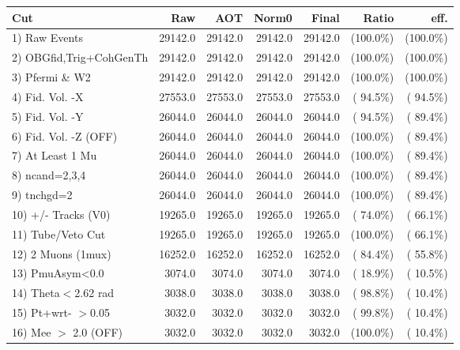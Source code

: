  \begin{table}[h!]\centering
 \begin{tabular}{||l||r|r|r|r|r|r||}
 \hline
 \hline
 Cut & Raw & AOT & Norm0 & Final & Ratio & eff.       \\
 \hline
  1) Raw Events           &      29142.0 &      29142.0 &      29142.0 &      29142.0 & (100.0\%) & (100.0\%) \\
  2) OBGfid,Trig+CohGenTh &      29142.0 &      29142.0 &      29142.0 &      29142.0 & (100.0\%) & (100.0\%) \\
  3) Pfermi \& W2         &      29142.0 &      29142.0 &      29142.0 &      29142.0 & (100.0\%) & (100.0\%) \\
  4) Fid. Vol. -X         &      27553.0 &      27553.0 &      27553.0 &      27553.0 & ( 94.5\%) & ( 94.5\%) \\
  5) Fid. Vol. -Y         &      26044.0 &      26044.0 &      26044.0 &      26044.0 & ( 94.5\%) & ( 89.4\%) \\
  6) Fid. Vol. -Z (OFF)   &      26044.0 &      26044.0 &      26044.0 &      26044.0 & (100.0\%) & ( 89.4\%) \\
  7) At Least 1 Mu        &      26044.0 &      26044.0 &      26044.0 &      26044.0 & (100.0\%) & ( 89.4\%) \\
  8) ncand=2,3,4          &      26044.0 &      26044.0 &      26044.0 &      26044.0 & (100.0\%) & ( 89.4\%) \\
  9) tnchgd=2             &      26044.0 &      26044.0 &      26044.0 &      26044.0 & (100.0\%) & ( 89.4\%) \\
 10) +/- Tracks (V0)      &      19265.0 &      19265.0 &      19265.0 &      19265.0 & ( 74.0\%) & ( 66.1\%) \\
 11) Tube/Veto Cut        &      19265.0 &      19265.0 &      19265.0 &      19265.0 & (100.0\%) & ( 66.1\%) \\
 12) 2 Muons (1mux)       &      16252.0 &      16252.0 &      16252.0 &      16252.0 & ( 84.4\%) & ( 55.8\%) \\
 13) PmuAsym<0.0          &       3074.0 &       3074.0 &       3074.0 &       3074.0 & ( 18.9\%) & ( 10.5\%) \\
 14) Theta$<$2.62 rad     &       3038.0 &       3038.0 &       3038.0 &       3038.0 & ( 98.8\%) & ( 10.4\%) \\
 15) Pt+wrt- $>$0.05      &       3032.0 &       3032.0 &       3032.0 &       3032.0 & ( 99.8\%) & ( 10.4\%) \\
 16) Mee $>$ 2.0  (OFF)   &       3032.0 &       3032.0 &       3032.0 &       3032.0 & (100.0\%) & ( 10.4\%) \\

\end{tabular}
\end{table}
